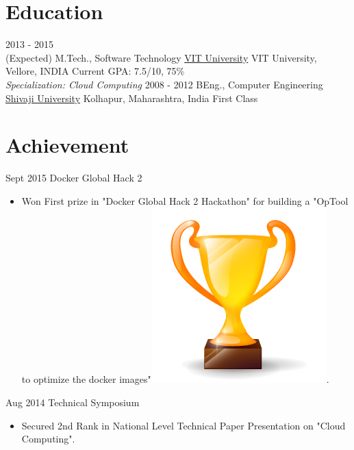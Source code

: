 \documentclass[letterpaper]{twentysecondcv} %
\begin{document}
\makeprofile %

\section{Education}

\begin{twenty} %
	\twentyitem
    	{2013 - 2015 \\ (Expected)}
        {M.Tech., Software Technology}
        {\href{http://www.vit.ac.in/}{VIT University}}
        { VIT University, Vellore, INDIA}
        {Current GPA: 7.5/10, 75\% \\ \textit{Specialization: Cloud Computing}}
	\twentyitem
    	{2008 - 2012}
        {BEng., Computer Engineering}
        {\href{http://www.unishivaji.ac.in/}{Shivaji University}}
        {Kolhapur, Maharashtra, India}
        {First Class}
\end{twenty}

\section{Achievement}
\begin{twenty}
	\twentyitem
    	{Sept 2015}
        { Docker Global Hack 2 }
        {}
        {}
        {
        {\begin{itemize}
        \item Won First prize in "Docker Global Hack 2 Hackathon" for building a "OpTool to optimize the docker images"{\includegraphics[scale=0.05]{img/trophy.png}}.
    \end{itemize}}
        }
        {}
\end{twenty}
\begin{twenty}
	\twentyitem
    	{Aug 2014}
        { Technical Symposium }
        {}
        {}
        {
        {\begin{itemize}
        \item Secured 2nd Rank in National Level Technical Paper Presentation on "Cloud Computing".
    \end{itemize}}
        }
\end{twenty}
	
\end{document}
